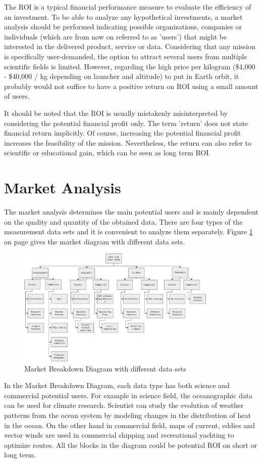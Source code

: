 The \ac{ROI} is a typical financial performance measure to evaluate the efficiency of an investment. To be able to analyze any hypothetical investments, a market analysis should be performed indicating possible organizations, companies or individuals (which are from now on referred to as 'users') that might be interested in the delivered product, service or data. Considering that any mission is specifically user-demanded, the option to attract several users from multiple scientific fields is limited. However, regarding the high price per kilogram (\$4,000 - \$40,000 / kg depending on launcher and altitude) to put in Earth orbit, it probably would not suffice to have a positive return on \acs{ROI} using a small amount of users. 

It should be noted that the \acs{ROI} is usually mistakenly misinterpreted by considering the potential financial profit only. The term 'return' does not state financial return implicitly. Of course, increasing the potential financial profit increases the feasibility of the mission. Nevertheless, the return can also refer to scientific or educational gain, which can be seen as long term \acs{ROI}. 

\section{Market Analysis}
  \label{blMAanalysis}
The market analysis determines the main potential users and is mainly dependent on the quality and quantity of the obtained data. There are four types of the measurement data sets and it is convenient to analyze them separately. Figure \ref{MA} on page \pageref{MA} gives the market diagram with different data sets.
\begin{figure} [h]
	\begin{center}
 \includegraphics[width=0.85\textwidth,angle=0]{chapters/img/Market_analysis.jpg}	
	\caption{Market Breakdown Diagram with different data sets\cite{Market}}
	\label{MA}
	\end{center}
\end{figure}
In the Market Breakdown Diagram, each data type has both science and commercial potential users. For example in science field, the oceanographic data can be used for climate research. Scientist can study the evolution of weather patterns from the ocean system by modeling changes in the distribution of heat in the ocean. On the other hand in commercial field, maps of current, eddies and vector winds are used in commercial shipping and recreational yachting to optimize routes. All the blocks in the diagram could be potential \acs{ROI} on short or long term.

